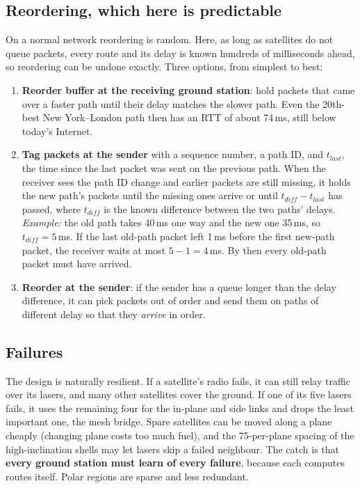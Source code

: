 \subsection{Reordering, which here is predictable}
On a normal network reordering is random. Here, as long as satellites do not queue packets, every route and its delay is known hundreds of milliseconds ahead, so
reordering can be undone exactly. Three options, from simplest to best:
\begin{enumerate}
  \item \textbf{Reorder buffer at the receiving ground station}: hold packets that came over a faster path until their delay matches the slower path. Even the 20th-best
        New York--London path then has an RTT of about 74\,ms, still below today's Internet.
  \item \textbf{Tag packets at the sender} with a sequence number, a path ID, and $t_{last}$, the time since the last packet was sent on the previous path. When the receiver
        sees the path ID change and earlier packets are still missing, it holds the new path's packets until the missing ones arrive or until $t_{diff} - t_{last}$ has
        passed, where $t_{diff}$ is the known difference between the two paths' delays. \textit{Example:} the old path takes 40\,ms one way and the new one 35\,ms, so
        $t_{diff} = 5$\,ms. If the last old-path packet left 1\,ms before the first new-path packet, the receiver waits at most $5 - 1 = 4$\,ms. By then every old-path packet
        must have arrived.
  \item \textbf{Reorder at the sender}: if the sender has a queue longer than the delay difference, it can pick packets out of order and send them on paths of different
        delay so that they \emph{arrive} in order.
\end{enumerate}

\subsection{Failures}
The design is naturally resilient. If a satellite's radio fails, it can still relay traffic over its lasers, and many other satellites cover the ground. If one of its
five lasers fails, it uses the remaining four for the in-plane and side links and drops the least important one, the mesh bridge. Spare satellites can be moved along a plane
cheaply (changing plane costs too much fuel), and the 75-per-plane spacing of the high-inclination shells may let lasers skip a failed neighbour. The catch is that
\textbf{every ground station must learn of every failure}, because each computes routes itself. Polar regions are sparse and less redundant.

